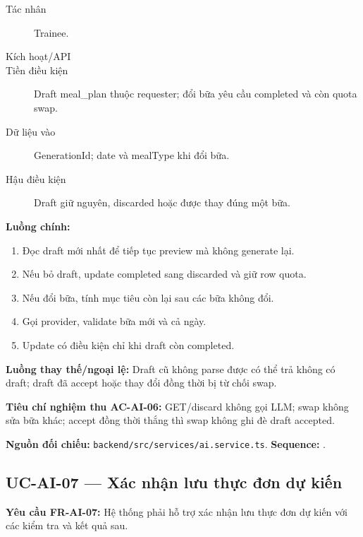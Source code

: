\documentclass[12pt,a4paper]{article}
\newcommand{\evidence}[1]{{\small\nolinkurl{#1}}}
\begin{document}
\begin{description}
\item[Tác nhân] Trainee.
\item[Kích hoạt/API] 
\item[Tiền điều kiện] Draft meal\_plan thuộc requester; đổi bữa yêu cầu completed và còn quota swap.
\item[Dữ liệu vào] GenerationId; date và mealType khi đổi bữa.
\item[Hậu điều kiện] Draft giữ nguyên, discarded hoặc được thay đúng một bữa.
\end{description}
\textbf{Luồng chính:}
\begin{enumerate}
  \item Đọc draft mới nhất để tiếp tục preview mà không generate lại.
  \item Nếu bỏ draft, update completed sang discarded và giữ row quota.
  \item Nếu đổi bữa, tính mục tiêu còn lại sau các bữa không đổi.
  \item Gọi provider, validate bữa mới và cả ngày.
  \item Update có điều kiện chỉ khi draft còn completed.
\end{enumerate}
\textbf{Luồng thay thế/ngoại lệ:} Draft cũ không parse được có thể trả không có draft; draft đã accept hoặc thay đổi đồng thời bị từ chối swap.

\textbf{Tiêu chí nghiệm thu AC-AI-06:} GET/discard không gọi LLM; swap không sửa bữa khác; accept đồng thời thắng thì swap không ghi đè draft accepted.

\textbf{Nguồn đối chiếu:} \evidence{backend/src/services/ai.service.ts}. \textbf{Sequence:} .

\subsection{UC-AI-07 --- Xác nhận lưu thực đơn dự kiến}
\label{uc-ai-7}
\textbf{Yêu cầu FR-AI-07:} Hệ thống phải hỗ trợ xác nhận lưu thực đơn dự kiến với các kiểm tra và kết quả sau.
\end{document}
